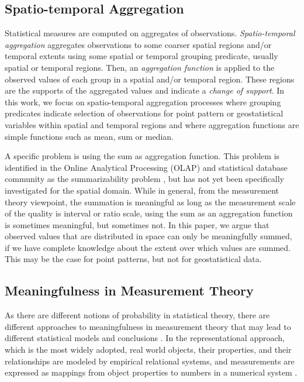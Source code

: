 \documentclass[final,authoryear,1p,times]{elsarticle}
\begin{document}
\subsection{Spatio-temporal Aggregation}
\label{stagg}

Statistical measures are computed on aggregates of observations. \textit{Spatio-temporal aggregation} \citep{Jeong2004,VegaLopez2005,Stasch2012a} aggregates observations to some coarser spatial regions and/or temporal extents using some spatial or temporal grouping predicate, usually spatial or temporal regions. Then, an \textit{aggregation function} is applied to the observed values of each group in a spatial and/or temporal region. These regions are the supports of the aggregated values and indicate a \textit{change of support}. In this work, we focus on spatio-temporal aggregation processes where grouping predicates indicate selection of observations for point pattern or geostatistical variables within spatial and temporal regions and where aggregation functions are simple functions such as mean, sum or median.

A specific problem is using the sum as aggregation function. This problem is identified in the Online Analytical Processing (OLAP) and statistical database community as the summarizability problem \citep{Lenz1997,Mazon2009}, but has not yet been specifically investigated for the spatial domain. While in general, from the measurement theory viewpoint, the summation is meaningful as long as the measurement scale of the quality is interval or ratio scale, using the sum as an aggregation function is sometimes meaningful, but sometimes not. In this paper, we argue that observed values that are distributed in space can only be meaningfully summed, if we have complete knowledge about the extent over which values are summed. This may be the case for point patterns, but not for geostatistical data.

\subsection{Meaningfulness in Measurement Theory}
\label{measTheory}

As there are different notions of probability in statistical theory,  there are different approaches to meaningfulness in measurement theory that may lead to different statistical models and conclusions \citep{Hand1996}. In the representational approach, which is the most widely adopted, real world objects, their properties, and their relationships are modeled by empirical relational systems, and measurements are expressed as mappings from object properties to numbers in a numerical system \citep{Suppes1967}. 
\end{document}
